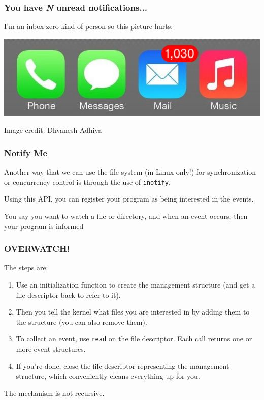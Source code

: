 \begin{frame}
	\frametitle{You have \textit{N} unread notifications...}

	I'm an inbox-zero kind of person so this picture hurts:

	\begin{center}
		\includegraphics[width=\textwidth]{images/inbox-nonzero.jpg}
	\end{center}
	\hfill Image credit: Dhvanesh Adhiya

\end{frame}


\begin{frame}
	\frametitle{Notify Me}

	Another way that we can use the file system (in Linux only!) for synchronization or concurrency control is through the use of \texttt{inotify}.

	Using this API, you can register your program as being interested in the events.

	You say you want to watch a file or directory, and when an event occurs, then your program is informed

\end{frame}


\begin{frame}
	\frametitle{OVERWATCH!}

	The steps are:

	\begin{enumerate}
		\item Use an initialization function to create the management structure (and get a file descriptor back to refer to it).
		\item Then you tell the kernel what files you are interested in by adding them to the structure (you can also remove them).
		\item To collect an event, use \texttt{read} on the file descriptor. Each call returns one or more event structures.
		\item If you're done, close the file descriptor representing the management structure, which conveniently cleans everything up for you.
	\end{enumerate}

	The mechanism is not recursive.

\end{frame}

